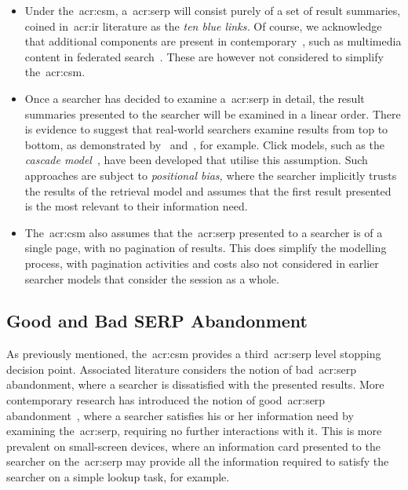 \begin{itemize}
    
    \item{ Under the~\gls{acr:csm}, a~\gls{acr:serp} will consist purely of a set of result summaries, coined in~\gls{acr:ir} literature as the \emph{ten blue links.} Of course, we acknowledge that additional components are present in contemporary~, such as multimedia content in federated search~\citep{chen2012federated_search_click_model}. These are however not considered to simplify the~\gls{acr:csm}.}
    
    \item{ Once a searcher has decided to examine a~\gls{acr:serp} in detail, the result summaries presented to the searcher will be examined in a linear order. There is evidence to suggest that real-world searchers examine results from top to bottom, as demonstrated by~\cite{joachims2002click_model} and~\cite{joachims2005click_model}, for example. Click models, such as the \emph{cascade model}~\citep{craswell2008click_models}, have been developed that utilise this assumption. Such approaches are subject to \emph{positional bias,} where the searcher implicitly trusts the results of the retrieval model and assumes that the first result presented is the most relevant to their information need.}
    
    \item{ The~\gls{acr:csm} also assumes that the~\gls{acr:serp} presented to a searcher is of a single page, with no pagination of results. This does simplify the modelling process, with pagination activities and costs also not considered in earlier searcher models that consider the session as a whole.}
    
\end{itemize}

\subsection{Good and Bad SERP Abandonment}\label{sec:csm:assumptions:good_abandonment}
As previously mentioned, the~\gls{acr:csm} provides a third~\gls{acr:serp} level stopping decision point. Associated literature considers the notion of bad~\gls{acr:serp} abandonment, where a searcher is dissatisfied with the presented results. More contemporary research has introduced the notion of good~\gls{acr:serp} abandonment~\citep{khabsa2016good_abandonment}, where a searcher satisfies his or her information need by examining the~\gls{acr:serp}, requiring no further interactions with it. This is more prevalent on small-screen devices, where an information card presented to the searcher on the~\gls{acr:serp} may provide all the information required to satisfy the searcher on a simple lookup task, for example.

